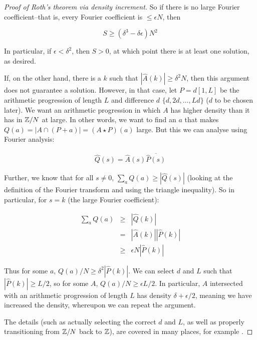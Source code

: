 \documentclass{report}
\theoremstyle{remark}
\numberwithin{equation}{section}
\begin{document}
\begin{proof}[Proof of Roth's theorem via density increment]
  So if there is no large Fourier coefficient--that is, every Fourier
  coefficient is $\leq \epsilon N$, then
  
  \[S \geq (\delta^3 - \delta\epsilon) N^2\]

  In particular, if $\epsilon < \delta^2$, then $S > 0$, at which
  point there is at least one solution, as desired.
  
  If, on the other hand, there is a $k$ such that
  $|\widehat{A}(k)| \geq \delta^2 N$, then this argument does not
  guarantee a solution.  However, in that case, let $P = d[1,L]$ be
  the arithmetic progression of length $L$ and difference $d$
  $\{d, 2d, \ldots ,Ld\}$ ($d$ to be chosen later).  We want an
  arithmetic progression in which $A$ has higher density than it has
  in $\mathbb{Z}/N$ at large.  In other words, we want to find an $a$ that
  makes $Q(a) = |A \cap (P+a)| = (A \star P)(a)$ large.  But this we
  can analyse using Fourier analysis:
  
  \begin{eqnarray*}
    \widehat{Q}(s) = \widehat{A}(s) \overline{\widehat{P}(s)}
  \end{eqnarray*}
  
  Further, we know that for all $s \neq 0$,
  $\sum_a Q(a) \geq |\widehat{Q}(s)|$ (looking at the definition of
  the Fourier transform and using the triangle inequality).  So in
  particular, for $s = k$ (the large Fourier coefficient):

\begin{eqnarray*}
  \sum_a Q(a) &\geq& |\widehat{Q}(k)| \\
              &=& |\widehat{A}(k)| |\widehat{P}(k)| \\
              &\geq& \epsilon N |\widehat{P}(k)| 
\end{eqnarray*}

Thus for some $a$, $Q(a)/N \geq \delta^2 |\widehat{P}(k)|$.  We can
select $d$ and $L$ such that $|\widehat{P}(k)| \geq L/2$, so for some
$A$, $Q(a)/N \geq \epsilon L/2$.  In particular, $A$ intersected with
an arithmetic progression of length $L$ has density
$\delta + \epsilon/2$, meaning we have increased the density,
whereupon we can repeat the argument.

The details (such as actually selecting the correct $d$ and $L$, as
well as properly transitioning from $\mathbb{Z}/N$ back to $\mathbb{Z}$), are covered
in many places, for example \cite{roth:jlm1953}.

\end{proof}
\end{document}
